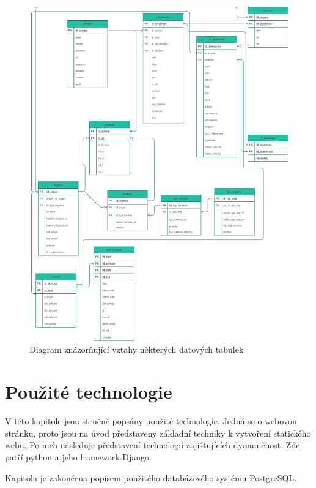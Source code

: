 \begin{figure}
    \centering
    \includegraphics[width=1\textwidth]{obrazky-figures/data_diagramy.pdf}
    \caption{Diagram znázorňující vztahy některých datových tabulek}
    \label{fig:psp-data-diagram}
\end{figure}




\chapter{Použité technologie}
\label{chap:technologie}
V této kapitole jsou stručně popsány použité technologie. Jedná se o webovou stránku, proto jsou na úvod představeny základní techniky k vytvoření statického webu. Po nich následuje představení technologií zajišťujících dynamičnost. Zde patří python a jeho framework Django.
\par Kapitola je zakončena popisem použitého databázového systému PostgreSQL.



